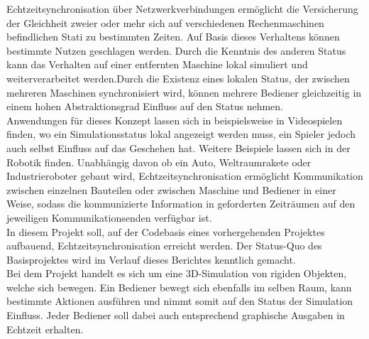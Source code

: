 Echtzeitsynchronisation über Netzwerkverbindungen ermöglicht die Versicherung der Gleichheit zweier oder mehr sich auf verschiedenen Rechenmaschinen befindlichen Stati zu bestimmten Zeiten. Auf Basis dieses Verhaltens können bestimmte Nutzen geschlagen werden. Durch die Kenntnis des anderen Status kann das Verhalten auf einer entfernten Maschine lokal simuliert und weiterverarbeitet werden.Durch die Existenz eines lokalen Status, der zwischen mehreren Maschinen synchronisiert wird, können mehrere Bediener gleichzeitig in einem hohen Abstraktionsgrad Einfluss auf den Status nehmen.\\
Anwendungen für dieses Konzept lassen sich in beispielsweise in Videospielen finden, wo ein Simulationsstatus lokal angezeigt werden muss, ein Spieler jedoch auch selbst Einfluss auf das Geschehen hat. Weitere Beispiele lassen sich in der Robotik finden. Unabhängig davon ob ein Auto, Weltraumrakete oder Industrieroboter gebaut wird, Echtzeitsynchronisation ermöglicht Kommunikation zwischen einzelnen Bauteilen oder zwischen Maschine und Bediener in einer Weise, sodass die kommunizierte Information in geforderten Zeiträumen auf den jeweiligen Kommunikationsenden verfügbar ist.\\
In diesem Projekt soll, auf der Codebasis eines vorhergehenden Projektes aufbauend, Echtzeitsynchronisation erreicht werden. Der Status-Quo des Basisprojektes wird im Verlauf dieses Berichtes kenntlich gemacht.\\
Bei dem Projekt handelt es sich um eine 3D-Simulation von rigiden Objekten, welche sich bewegen. Ein Bediener bewegt sich ebenfalls im selben Raum, kann bestimmte Aktionen ausführen und nimmt somit auf den Status der Simulation Einfluss. Jeder Bediener soll dabei auch entsprechend graphische Ausgaben in Echtzeit erhalten.